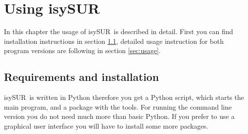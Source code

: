 \documentclass[11pt,fleqn]{book} %
\newcommand{\ProjectTitle}{isySUR}
\newcommand{\pt}{\ProjectTitle}
\begin{document}
\chapter{Using \ProjectTitle}
In this chapter the usage of \pt\ is described in detail. First you can find installation instructions in section \ref{sec:installation}, detailed usage instruction for both program versions are following in section \ref{sec:usage}.

\section{Requirements and installation}\label{sec:installation}
\pt\ is written in Python therefore you get a Python script, which starts the main program, and a package with the tools. For running the command line version you do not need much more than basic Python. If you prefer to use a graphical user interface you will have to install some more packages.
\end{document}
